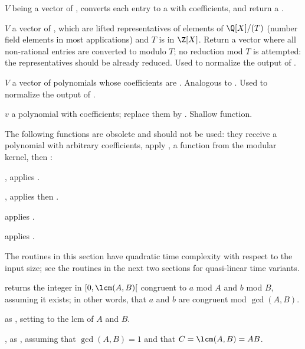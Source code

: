  $V$ being a vector of ,
converts each entry to a  with  coefficients, and return
a .

 $V$ a vector of , which
are lifted representatives of elements of $\Q[X]/(T)$ (number field elements
in most applications) and $T$ is in $\Z[X]$. Return a vector where all
non-rational entries are converted to  modulo $T$; no reduction
mod $T$ is attempted: the representatives should be already reduced. Used to
normalize the output of .

 $V$ a vector of polynomials whose
coefficients are . Analogous to .
Used to normalize the output of .

 $v$ a polynomial with 
coefficients; replace them by . Shallow function.

The following functions are obsolete and should not be used: they receive a
polynomial with arbitrary coefficients, apply , a function
from the modular kernel, then :

, applies .

, applies  then
.

 applies .

 applies .

The routines in this section have quadratic time complexity with respect to
the input size; see the routines in the next two sections for quasi-linear
time variants.

 returns the integer
in $[0, \lcm(A,B)[$ congruent to $a$ mod $A$ and $b$ mod $B$, assuming it
exists; in other words, that $a$ and $b$ are congruent mod $\gcd(A,B)$.

 as
, setting  to the lcm of $A$ and $B$.

, as
, assuming that $\gcd(A,B) = 1$ and that $C = \lcm(A,B) = AB$.

